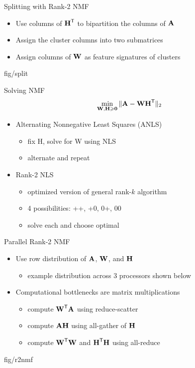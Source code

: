 \documentclass{beamer}
\begin{document}
\begin{frame}{Splitting with Rank-2 NMF}
    \begin{itemize}
        \item Use columns of $\M{H}^\Tra$ to bipartition the columns of $\M{A}$
        \item Assign the cluster columns into two submatrices
        \item Assign columns of $\M{W}$ as feature signatures of clusters
    \end{itemize}
    \begin{adjustbox}{max totalsize={.7\textwidth}{.6\textheight},center}
        {fig/split}
    \end{adjustbox}
\end{frame}

\begin{frame}{Solving NMF}
    $$\min_{\M{W},\M{H}\geq \M{0}} \|\M{A} - \M{W}\M{H}^\Tra\|_2$$
    \begin{itemize}
        \item Alternating Nonnegative Least Squares (ANLS)
        \begin{itemize}
            \item fix H, solve for W using NLS
            \item alternate and repeat
        \end{itemize}
        \vfill
        \item Rank-2 NLS
        \begin{itemize}
            \item optimized version of general rank-$k$ algorithm
            \item 4 possibilities: ++, +0, 0+, 00
            \item solve each and choose optimal
        \end{itemize}
    \end{itemize}
\end{frame}

\begin{frame}{Parallel Rank-2 NMF}
    \begin{itemize}
        \item Use row distribution of $\M{A}$, $\M{W}$, and $\M{H}$ 
        \begin{itemize}
        		\item example distribution across 3 processors shown below
        \end{itemize}
        \vfill
        \item Computational bottlenecks are matrix multiplications
        \begin{itemize}
            \item compute $\M{W}^\Tra\M{A}$ using reduce-scatter
            \item compute $\M{A}\M{H}$ using all-gather of $\M{H}$
            \item compute $\M{W}^\Tra\M{W}$ and $\M{H}^\Tra\M{H}$ using all-reduce
        \end{itemize}
    \end{itemize}
    {fig/r2nmf}
\end{frame}
\end{document}
